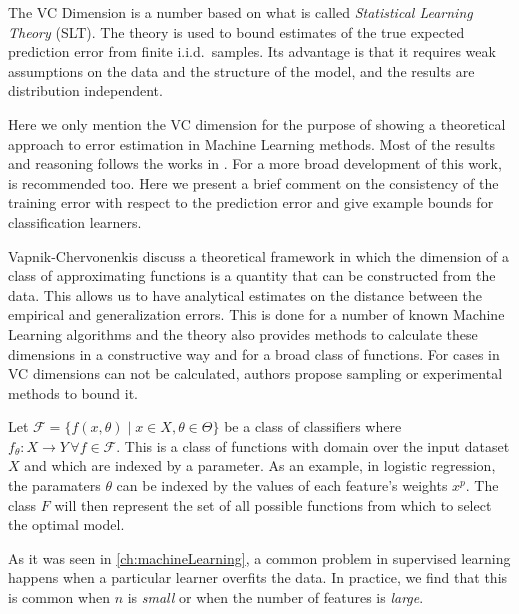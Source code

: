 \begin{appendices}
The VC Dimension is a number based on what is called \textit{Statistical Learning Theory} (SLT).
The theory is used to bound estimates of the true expected prediction error from finite i.i.d.\ samples.
Its advantage is that it requires weak assumptions on the data and the structure of the model, and the results are distribution independent.

Here we only mention the VC dimension for the purpose of showing a theoretical approach to error estimation in Machine Learning methods.
Most of the results and reasoning follows the works in \citep{cherkassky-learning2007}.
For a more broad development of this work, \citep{vapnik-nature2000} is recommended too.
Here we present a brief comment on the consistency of the training error with respect to the prediction error and give example bounds for classification learners.


Vapnik-Chervonenkis discuss a theoretical framework in which the dimension of a class of approximating functions is a quantity that can be constructed from the data.
This allows us to have analytical estimates on the distance between the empirical and generalization errors.
This is done for a number of known Machine Learning algorithms and the theory also provides methods to calculate these dimensions in a constructive way and for a broad class of functions.
For cases in VC dimensions can not be calculated, authors propose sampling or experimental methods to bound it.


Let $\mathcal {F} = \big \{ f(x,\theta) \mid x \in X, \theta \in \Theta \big \}$ be a class of classifiers where $f_\theta: X \rightarrow Y \, \forall f \in \mathcal {F}$.
This is a class of functions with domain over the input dataset $X$ and which are indexed by a parameter.
As an example, in logistic regression, the paramaters $\theta$ can be indexed by the values of each feature's weights $x^p$.
The class $F$ will then represent the set of all possible functions from which to select the optimal model.

As it was seen in \cref{ch:machineLearning}, a common problem in supervised learning happens when a particular learner overfits the data.
In practice, we find that this is common when $n$ is \textit{small} or when the number of features is \textit{large}.


\end{appendices}

